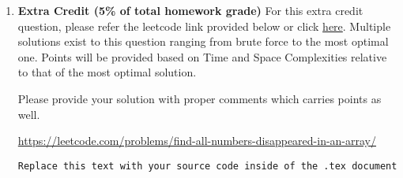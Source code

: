\documentclass[12pt]{article}
\begin{document}
\begin{enumerate}
\begin{enumerate}[label=(\alph*)]
{        }

    \end{enumerate}

\pagebreak
    
    \item \textbf{Extra Credit (5\% of total homework grade)}
    For this extra credit question, please refer the leetcode link provided below or click \href{https://leetcode.com/problems/find-all-numbers-disappeared-in-an-array/}{here}. Multiple solutions exist to this question ranging from brute force to the most optimal one. Points will be provided based on Time and Space Complexities relative to that of the most optimal solution.

    Please provide your solution with proper comments which carries points as well.
    
   \url{https://leetcode.com/problems/find-all-numbers-disappeared-in-an-array/}

\begin{verbatim}
Replace this text with your source code inside of the .tex document
\end{verbatim}
	
\end{enumerate}
\end{document}
